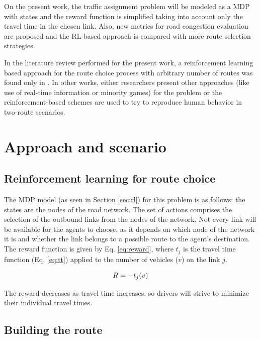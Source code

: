 \documentclass{RITA}
\newcommand{\travTime}{\ensuremath{t_j}} 	%
\newcommand{\veh}{\ensuremath{v}}		%
\newcommand{\reward}[1][]{\ensuremath{R_#1}}	%
\begin{document}
On the present work, the traffic assignment problem will be modeled as a MDP with states and the reward function is simplified taking into account only the travel time in the chosen link. Also, new metrics for road congestion evaluation are proposed and the RL-based approach is compared with more route selection strategies. %

In the literature review performed for the present work, a reinforcement learning based approach for the route choice process with arbitrary number of routes was found only in \cite{Tavares&Bazzan2012}. In other works, either researchers present other approaches (like use of real-time information or minority games) for the problem or the reinforcement-based schemes are used to try to reproduce human behavior in two-route scenarios.

\section{Approach and scenario}
\label{sec:proposal}

\subsection{Reinforcement learning for route choice}

The MDP model (as seen in Section \ref{sec:rl}) for this problem is as follows: the states are the nodes of the road network. The set of actions comprises the selection of the outbound links from the nodes of the network. Not every link will be available for the agents to choose, as it depends on which node of the network it is and whether the link belongs to a possible route to the agent's destination. The reward function is given by Eq. \eqref{eq:reward}, where $\travTime$ is the travel time function (Eq. \eqref{eq:tt}) applied to the number of vehicles ($\veh$) on the link $j$.

\begin{equation}
\label{eq:reward}
\reward{} = - \travTime(\veh)
\end{equation}

The reward decreases as travel time increases, so drivers will strive to minimize their individual travel times.

\subsection{Building the route}
\end{document}
